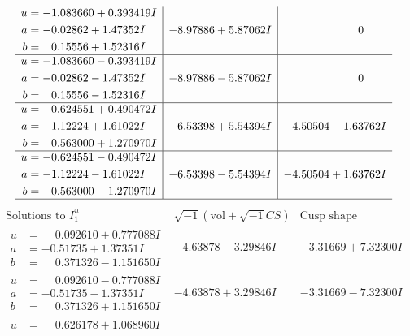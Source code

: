 \documentclass[1p]{elsarticle_modified}
\theoremstyle{definition}
\newcommand{\I}{\sqrt{-1}}
\begin{document}
$$\begin{array}{c|c|c}
\begin{aligned}
u &= -1.083660 + 0.393419 I \\
a &= -0.02862 + 1.47352 I \\
b &= \phantom{-}0.15556 + 1.52316 I\end{aligned}
 & -8.97886 + 5.87062 I & \phantom{-0.000000 } 0 \\ \hline\begin{aligned}
u &= -1.083660 - 0.393419 I \\
a &= -0.02862 - 1.47352 I \\
b &= \phantom{-}0.15556 - 1.52316 I\end{aligned}
 & -8.97886 - 5.87062 I & \phantom{-0.000000 } 0 \\ \hline\begin{aligned}
u &= -0.624551 + 0.490472 I \\
a &= -1.12224 + 1.61022 I \\
b &= \phantom{-}0.563000 + 1.270970 I\end{aligned}
 & -6.53398 + 5.54394 I & -4.50504 - 1.63762 I \\ \hline\begin{aligned}
u &= -0.624551 - 0.490472 I \\
a &= -1.12224 - 1.61022 I \\
b &= \phantom{-}0.563000 - 1.270970 I\end{aligned}
 & -6.53398 - 5.54394 I & -4.50504 + 1.63762 I\\
 \hline 
 \end{array}$$\newpage$$\begin{array}{c|c|c}  
\text{Solutions to }I^u_{1}& \I (\text{vol} + \sqrt{-1}CS) & \text{Cusp shape}\\
 \hline 
\begin{aligned}
u &= \phantom{-}0.092610 + 0.777088 I \\
a &= -0.51735 + 1.37351 I \\
b &= \phantom{-}0.371326 - 1.151650 I\end{aligned}
 & -4.63878 - 3.29846 I & -3.31669 + 7.32300 I \\ \hline\begin{aligned}
u &= \phantom{-}0.092610 - 0.777088 I \\
a &= -0.51735 - 1.37351 I \\
b &= \phantom{-}0.371326 + 1.151650 I\end{aligned}
 & -4.63878 + 3.29846 I & -3.31669 - 7.32300 I \\ \hline\begin{aligned}
u &= \phantom{-}0.626178 + 1.068960 I \\

\end{aligned}
\end{array}$$
\end{document}
